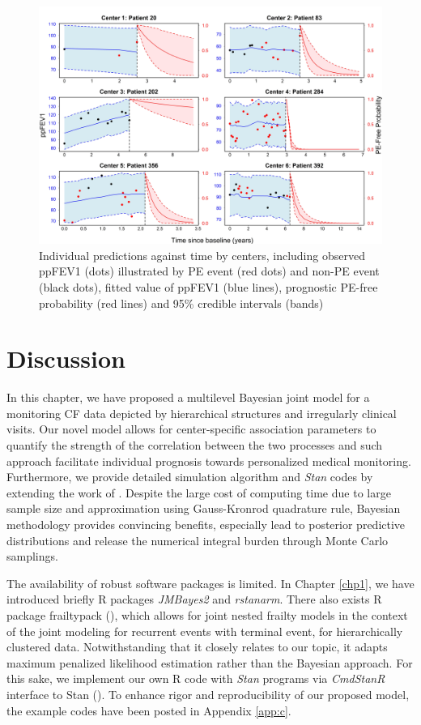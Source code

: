 \begin{figure}[ht]
\includegraphics[width=\textwidth]{Figures/Chp3_PRED_PLOT2.jpg}
\caption{Individual predictions against time by centers, including observed ppFEV1 (dots) illustrated by PE event (red dots) and non-PE event (black dots), fitted value of ppFEV1 (blue lines), prognostic PE-free probability (red lines) and 95\% credible intervals (bands)}
\label{fig:chp3_pred}
\end{figure}

\section{Discussion} \label{sec:chp3_diss}

In this chapter, we have proposed a multilevel Bayesian joint model for a monitoring CF data depicted by hierarchical structures and irregularly clinical visits. Our novel model allows for center-specific association parameters to quantify the strength of the correlation between the two processes and such approach facilitate individual prognosis towards personalized medical monitoring. Furthermore, we provide detailed simulation algorithm and \emph{Stan} codes by extending the work of \cite{Brilleman2018}. Despite the large cost of computing time due to large sample size and approximation using Gauss-Kronrod quadrature rule, Bayesian methodology provides convincing benefits, especially lead to posterior predictive distributions and release the numerical integral burden through Monte Carlo samplings.

The availability of robust software packages is limited. In Chapter \ref{chp1}, we have introduced briefly R packages \emph{JMBayes2} and \emph{rstanarm}. There also exists R package frailtypack (\cite{Rondeau2019}), which allows for joint nested frailty models in the context of the joint modeling for recurrent events with terminal event, for hierarchically clustered data. Notwithstanding that it closely relates to our topic, it adapts maximum penalized likelihood estimation rather than the Bayesian approach. For this sake, we implement our own R code with \emph{Stan} programs via \emph{CmdStanR} interface to Stan (\cite{Gabry2022}). To enhance rigor and reproducibility of our proposed model, the example codes have been posted in Appendix \ref{app:c}.  

